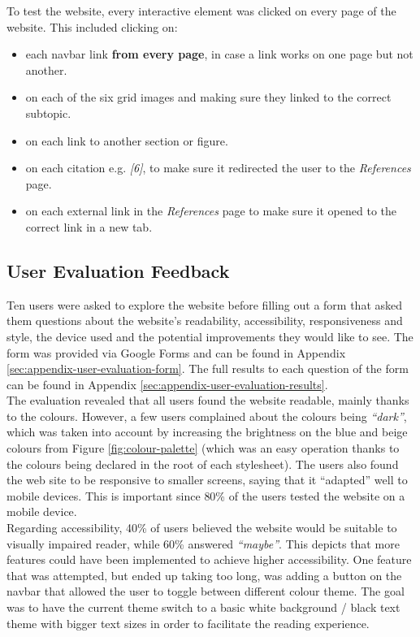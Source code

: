 \documentclass[letterpaper,12pt]{article}
\begin{document}
To test the website, every interactive element was clicked on every page of the website. This included clicking on:
\begin{itemize}
    \item each navbar link \textbf{from every page}, in case a link works on one page but not another.
    \item on each of the six grid images and making sure they linked to the correct subtopic.
    \item on each link to another section or figure.
    \item on each citation e.g. \textit{[6]}, to make sure it redirected the user to the \textit{References} page.
    \item on each external link in the \textit{References} page to make sure it opened to the correct link in a new tab.
\end{itemize}

\subsection{User Evaluation Feedback}

Ten users were asked to explore the website before filling out a form that asked them questions about the website's readability, accessibility, responsiveness and style, the device used and the potential improvements they would like to see. The form was provided via Google Forms and can be found in Appendix \ref{sec:appendix-user-evaluation-form}. The full results to each question of the form can be found in Appendix \ref{sec:appendix-user-evaluation-results}.\\

The evaluation revealed that all users found the website readable, mainly thanks to the colours. However, a few users complained about the colours being \textit{``dark''}, which was taken into account by increasing the brightness on the blue and beige colours from Figure \ref{fig:colour-palette} (which was an easy operation thanks to the colours being declared in the root of each stylesheet). The users also found the web site to be responsive to smaller screens, saying that it ``adapted'' well to mobile devices. This is important since 80\% of the users tested the website on a mobile device.\\

Regarding accessibility, 40\% of users believed the website would be suitable to visually impaired reader, while 60\% answered \textit{``maybe''}. This depicts that more features could have been implemented to achieve higher accessibility. One feature that was attempted, but ended up taking too long, was adding a button on the navbar that allowed the user to toggle between different colour theme. The goal was to have the current theme switch to a basic white background / black text theme with bigger text sizes in order to facilitate the reading experience.
\end{document}
